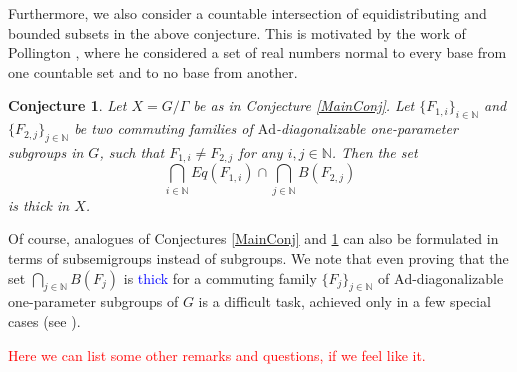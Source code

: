 \documentclass[reqno,12pt]{amsart}
\newtheorem{conjecture}[theorem]{Conjecture}
\theoremstyle{definition}
\numberwithin{equation}{section}
\newcommand{\NN}{\mathbb{N}}
\newcommand{\Ad}{\mathrm{Ad}}
\newcommand {\new}[1]   {\textcolor{blue}{#1}}
\newcommand {\comm}[1]   {\textcolor{red}{#1}}
\begin{document}
{{{Furthermore, we also consider a countable intersection of equidistributing and bounded subsets in the above conjecture. This is motivated by %
{the} work of Pollington \cite{P81}, where he considered a set of {real} numbers %
normal to every base from one countable set and to no base from another.}

\begin{conjecture}\label{MultiConj}
 Let $X=G/\Gamma$ be as in Conjecture \ref{MainConj}.
 Let $\{F_{1,i}\}_{i\in \NN}$ and $\{F_{2,j}\}_{j\in \NN}$ be two commuting families of %
 $\Ad$-diagonalizable one-parameter subgroups in $G$, such that $F_{1,i}\neq F_{2,j}$ for any $i,j\in \NN$. Then the set $$\bigcap_{i\in \NN}Eq(F_{1,i})\cap \bigcap_{j\in \NN}B(F_{2,j})$$ is thick in $X$. \end{conjecture}

Of course, analogues of Conjectures \ref{MainConj} and \ref{MultiConj} can also be formulated in terms of subsemigroups instead of subgroups. We note that even proving that the set $\bigcap_{j\in \NN}B(F_{j})$ is \new{thick} %
for a commuting family $\{F_j\}_{j\in\NN}$ of %
 $\Ad$-diagonalizable one-parameter subgroups of $G$ is a difficult task, achieved only in a few special cases (see \cite{AGK15,GW18}).

 \comm{Here we can list some other remarks and questions, if we feel like it.}}

\appendix
}
\end{document}
